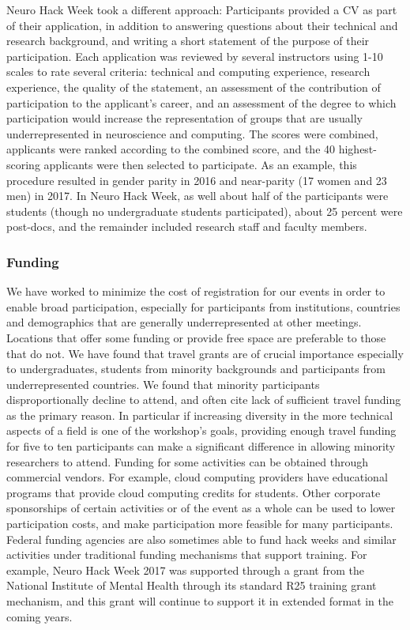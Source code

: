 \documentclass{aastex62}
\begin{document}
Neuro Hack Week took a different approach: Participants provided a CV as part of their application, in addition to answering questions about their technical and research background, and writing a short statement of the purpose of their participation. Each application was reviewed by several instructors using 1-10 scales to rate several criteria: technical and computing experience, research experience, the quality of the statement, an assessment of the contribution of participation to the applicant's career, and an assessment of the degree to which participation would increase the representation of groups that are usually underrepresented in neuroscience and computing. The scores were combined, applicants were ranked according to the combined score, and the 40 highest-scoring applicants were then selected to participate. As an example,  this procedure resulted in gender parity in 2016 and near-parity (17 women and 23 men) in 2017. In Neuro Hack Week, as well about half of the participants were students (though no undergraduate students participated), about 25 percent were post-docs, and the remainder included research staff and faculty members.

\subsubsection{Funding}

We have worked to minimize the cost of registration for our events in order to enable broad participation, especially for participants from institutions, countries and demographics that are generally underrepresented at other meetings. Locations that offer some funding or provide free space are preferable to those that do not.
We have found that travel grants are of crucial importance especially to undergraduates, students from minority backgrounds and participants from underrepresented countries. We found that minority participants disproportionally decline to attend, and often cite lack of sufficient travel funding as the primary reason. In particular if increasing diversity in the more technical aspects of a field is one of the workshop's goals, providing enough travel funding for five to ten participants can make a significant difference in allowing minority researchers to attend.
Funding for some activities can be obtained through commercial vendors.
For example, cloud computing providers have educational programs that provide cloud computing credits for students.
Other corporate sponsorships of certain activities or of the event as a whole can be used to lower participation costs, and make participation more feasible for many participants.
Federal funding agencies are also sometimes able to fund hack weeks and similar activities under traditional funding mechanisms that support training. For example, Neuro Hack Week 2017 was supported through a grant from the National Institute of Mental Health through its standard R25 training grant mechanism, and this grant will continue to support it in extended format in the coming years.
\end{document}
